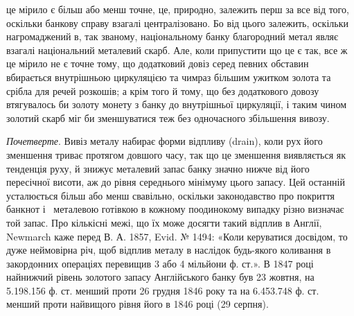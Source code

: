 \parcont{}  %
це мірило є більш або менш точне, це, природно, залежить перш за все від
того, оскільки банкову справу взагалі централізовано. Бо від цього залежить,
оскільки нагромаджений в, так званому, національному банку благородний метал
являє взагалі національний металевий скарб. Але, коли припустити що це є так,
все ж це мірило не є точне тому, що додатковий довіз серед певних обставин
вбирається внутрішньою циркуляцією та чимраз більшим ужитком золота та
срібла для речей розкошів; а крім того й тому, що без додаткового довозу
втягувалось би золоту монету з банку до внутрішньої циркуляції, і таким
чином золотий скарб міг би зменшуватися теж без одночасного збільшення вивозу.

\emph{Почетверте}. Вивіз металу набирає форми відпливу (drain), коли рух
його зменшення триває протягом довшого часу, так що це зменшення виявляється
як тенденція руху, й знижує металевий запас банку значно нижче від його пересічної
висоти, аж до рівня середнього мінімуму цього запасу. Цей останній усталюється
більш або менш свавільно, оскільки законодавство про покриття банкнот і~
металевою готівкою в кожному поодинокому випадку різно визначає той запас.
Про кількісні межі, що їх може досягти такий відплив в Англії, Newmarch
каже перед В. А. 1857, Evid. № 1494: «Коли керуватися досвідом, то дуже
неймовірна річ, щоб відплив металу в наслідок будь-якого коливання в закордонних
операціях перевищив 3 або 4 мільйони ф. ст.». В 1847 році найнижчий
рівень золотого запасу Англійського банку був 23 жовтня, на \num{5.198.156} ф. ст.
менший проти 26 грудня 1846 року та на \num{6.453.748} ф. ст. менший проти найвищого
рівня його в 1846 році (29 серпня).

